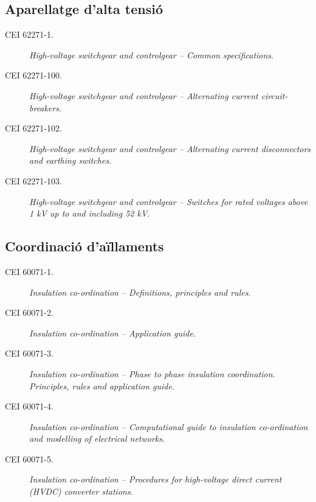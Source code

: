 \subsection*{Aparellatge d'alta tensió}
\begin{description}
    \item [\hspace{5mm}CEI 62271-1.] \textit{High-voltage switchgear and controlgear -- Common specifications}.
    \item [\hspace{5mm}CEI 62271-100.] \textit{High-voltage switchgear and controlgear -- Alternating current circuit-breakers}.
    \item [\hspace{5mm}CEI 62271-102.] \textit{High-voltage switchgear and controlgear -- Alternating current disconnectors and earthing switches}.
    \item [\hspace{5mm}CEI 62271-103.] \textit{High-voltage switchgear and controlgear -- Switches for rated voltages above 1 kV up to and including 52 kV}.
\end{description}

\subsection*{Coordinació d'aïllaments}
\begin{description}
    \item [\hspace{5mm}CEI 60071-1.] \textit{Insulation co-ordination -- Definitions, principles and rules}.
    \item [\hspace{5mm}CEI 60071-2.] \textit{Insulation co-ordination -- Application guide}.
    \item [\hspace{5mm}CEI 60071-3.] \textit{Insulation co-ordination -- Phase to phase insulation coordination. Principles, rules and application guide}.
    \item [\hspace{5mm}CEI 60071-4.] \textit{Insulation co-ordination -- Computational guide to insulation co-ordination and modelling of electrical networks}.
    \item [\hspace{5mm}CEI 60071-5.] \textit{Insulation co-ordination -- Procedures for high-voltage direct current (HVDC) converter stations}.
\end{description}


